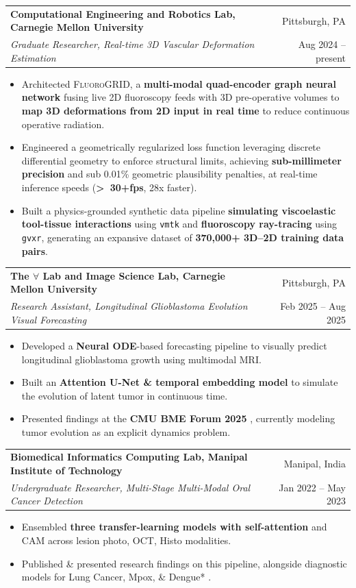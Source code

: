 \documentclass[letterpaper,10pt]{article}
\makeatletter
\newcommand{\resumeItem}[1]{\item\small{#1}}
\newcommand{\resumeSubheading}[4]{
  \vspace{-1pt}\item
    \begin{tabular*}{0.97\textwidth}[t]{l@{\extracolsep{\fill}}r}
      \textbf{#1} & #2 \\
      \textit{#3} & #4 \\
    \end{tabular*}\vspace{-3pt}
}
\newcommand{\resumeItemListStart}{\begin{itemize}[leftmargin=0.2in, itemsep=1pt, parsep=0pt]}
\newcommand{\resumeItemListEnd}{\end{itemize}\vspace{-2pt}}
\makeatother
\begin{document}
    \resumeSubheading
      {Computational Engineering and Robotics Lab, Carnegie Mellon University}{Pittsburgh, PA}
      {Graduate Researcher, Real-time 3D Vascular Deformation Estimation \href{https://tushar-nayak.github.io/assets/pdf/tusharn-poster.pdf}{\textbf{} \faChalkboardTeacher}}{Aug 2024 -- present}
      \resumeItemListStart
        \resumeItem{Architected {\textsc{FluoroGRID}}, a \textbf{multi-modal quad-encoder graph neural network} fusing live 2D fluoroscopy feeds with 3D pre-operative volumes to \textbf{map 3D deformations from 2D input in real time} to reduce continuous operative radiation.}
        \resumeItem{Engineered a geometrically regularized loss function leveraging discrete differential geometry to enforce structural limits, achieving \textbf{sub-millimeter precision} and sub 0.01\% geometric plausibility penalties, at real-time inference speeds (\textbf{\textgreater~30+fps}, 28x faster).}
        \resumeItem{Built a physics-grounded synthetic data pipeline \textbf{simulating viscoelastic tool-tissue interactions} using {\texttt{vmtk}} and \textbf{fluoroscopy ray-tracing} using {\texttt{gvxr}}, generating an expansive dataset of \textbf{370,000+ 3D--2D training data pairs}.}
      \resumeItemListEnd

    \resumeSubheading
      {The $\forall$ Lab and Image Science Lab, Carnegie Mellon University}{Pittsburgh, PA}
      {Research Assistant, Longitudinal Glioblastoma Evolution Visual Forecasting {\href{https://tushar-nayak.github.io/glioblastoma-evolution/}{\small \texttt{\faLink}}}}{Feb 2025 -- Aug 2025}
      \resumeItemListStart
        \resumeItem{Developed a \textbf{Neural ODE}-based forecasting pipeline to visually predict longitudinal glioblastoma growth using multimodal MRI.}
        \resumeItem{Built an \textbf{Attention U-Net \& temporal embedding model} to simulate the evolution of latent tumor in continuous time.}
        \resumeItem{Presented findings at the \textbf{CMU BME Forum 2025} \href{https://www.youtube.com/watch?v=Rw9KHNOaAL0}{\faYoutube}, currently modeling tumor evolution as an explicit dynamics problem.}
      \resumeItemListEnd

    \resumeSubheading
      {Biomedical Informatics Computing Lab, Manipal Institute of Technology}{Manipal, India}
      {Undergraduate Researcher, Multi-Stage Multi-Modal Oral Cancer Detection}{Jan 2022 -- May 2023}
      \resumeItemListStart
        \resumeItem{Ensembled \textbf{three transfer-learning models with self-attention} and CAM across lesion photo, OCT, Histo modalities.}
        \resumeItem{Published \& presented research findings on this pipeline, alongside diagnostic models for Lung Cancer, Mpox, \& Dengue* \href{https://scholar.google.com/citations?user=9xUX7NoAAAAJ&hl=en}{\faGraduationCap}.}
      \resumeItemListEnd
      
\end{document}
